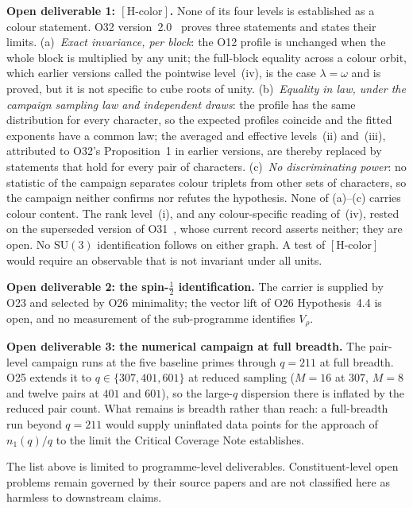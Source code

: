 \documentclass[11pt,a4paper]{article}
\theoremstyle{definition}
\newcommand{\SU}{\mathrm{SU}}
\begin{document}
    \textbf{Open deliverable 1: $[\mathrm{H\text{-}color}]$.}
    None of its four levels is established as a colour statement.
    O32 version~2.0~\cite{Beau2026a36} proves three statements and states their limits.
    (a)~\emph{Exact invariance, per block}: the O12 profile is unchanged when the whole block is
    multiplied by any unit; the full-block equality across a colour orbit, which earlier versions
    called the pointwise level~(iv), is the case $\lambda=\omega$ and is proved, but it is not
    specific to cube roots of unity.
    (b)~\emph{Equality in law, under the campaign sampling law and independent draws}: the profile
    has the same distribution for every character, so the expected profiles coincide and the fitted
    exponents have a common law; the averaged and effective levels~(ii) and~(iii), attributed to
    O32's Proposition~1 in earlier versions, are thereby replaced by statements that hold for every
    pair of characters.
    (c)~\emph{No discriminating power}: no statistic of the campaign separates colour triplets from
    other sets of characters, so the campaign neither confirms nor refutes the hypothesis.
    None of (a)--(c) carries colour content.
    The rank level~(i), and any colour-specific reading of~(iv), rested on the superseded version of
    O31~\cite{Beau2026a35}, whose current record asserts neither; they are open.
    No $\SU(3)$ identification follows on either graph.
    A test of $[\mathrm{H\text{-}color}]$ would require an observable that is not invariant under
    all units.

    \textbf{Open deliverable 2: the spin-$\tfrac{1}{2}$ identification.}
    The carrier is supplied by O23 and selected by O26 minimality; the vector lift of O26
    Hypothesis~4.4 is open, and no measurement of the sub-programme identifies $V_\rho$.

    \textbf{Open deliverable 3: the numerical campaign at full breadth.}
    The pair-level campaign runs at the five baseline primes through $q = 211$ at full breadth.
    O25 extends it to $q \in \{307, 401, 601\}$ at reduced sampling ($M = 16$ at $307$, $M = 8$
    and twelve pairs at $401$ and $601$), so the large-$q$ dispersion there is inflated by the
    reduced pair count.
    What remains is breadth rather than reach: a full-breadth run beyond $q = 211$ would
    supply uninflated data points for the approach of $n_1(q)/q$ to the limit the Critical
    Coverage Note establishes.

    \medskip
    \noindent The list above is limited to programme-level deliverables.
    Constituent-level open problems remain governed by their source papers and are not classified
    here as harmless to downstream claims.
\end{document}
